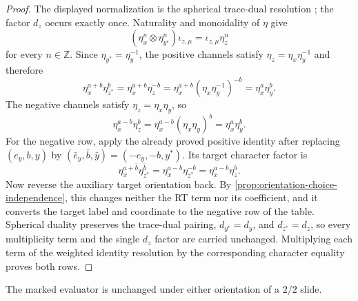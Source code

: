 \begin{proof}
The displayed normalization is the spherical trace-dual resolution
\cite[Lemma~2.37, Equation~(2.2.5)]{BarenzBarrett2018}; the factor $d_z$
occurs exactly once.  Naturality and monoidality of $\eta$ give
\[
  (\eta_x^n\otimes\eta_{y^{\varepsilon}}^n)\iota_{z,\mu}
  =\iota_{z,\mu}\eta_z^n
\]
for every $n\in\mathbb Z$.  Since
$\eta_{y^*}=\eta_y^{-1}$, the positive channels satisfy
$\eta_z=\eta_x\eta_y^{-1}$ and therefore
\[
  \eta_x^{a+b}\eta_{z^*}^{b}
  =\eta_x^{a+b}\eta_z^{-b}
  =\eta_x^{a+b}(\eta_x\eta_y^{-1})^{-b}
  =\eta_x^a\eta_y^b.
\]
The negative channels satisfy $\eta_z=\eta_x\eta_y$, so
\[
  \eta_x^{a-b}\eta_z^b
  =\eta_x^{a-b}(\eta_x\eta_y)^b
  =\eta_x^a\eta_y^b.
\]
For the negative row, apply the already proved positive identity after replacing
$(e_y,b,y)$ by $(\bar e_y,\bar b,\bar y)=(-e_y,-b,y^*)$.  Its target character
factor is
\[
  \eta_x^{a+\bar b}\eta_{z^*}^{\bar b}
  =\eta_x^{a-b}\eta_{z^*}^{-b}
  =\eta_x^{a-b}\eta_z^b.
\]
Now reverse the auxiliary target orientation back.  By
\cref{prop:orientation-choice-independence}, this changes neither the RT term
nor its coefficient, and it converts the target label and coordinate to the
negative row of the table.  Spherical duality preserves the trace-dual pairing,
$d_{y^*}=d_y$, and $d_{z^*}=d_z$, so every multiplicity term and the single
$d_z$ factor are carried unchanged.  Multiplying each term of the weighted
identity resolution by the corresponding character equality proves both rows.
\end{proof}

\begin{lemma}
\label{lem:character-aware-two-two}
The marked evaluator is unchanged under either orientation of a $2/2$
slide.
\end{lemma}

